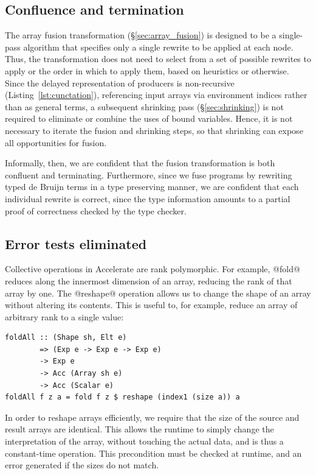 \subsection{Confluence and termination}

The array fusion transformation (\S\ref{sec:array_fusion}) is
designed to be a single-pass algorithm that specifies only a single rewrite to
be applied at each node. Thus, the transformation does not need to select from a
set of possible rewrites to apply or the order in which to apply them, based on
heuristics or otherwise. Since the delayed representation of producers is
non-recursive (Listing~\ref{lst:cunctation}), referencing input arrays via
environment indices rather than as general terms, a subsequent shrinking pass
(\S\ref{sec:shrinking}) is not required to eliminate or combine the uses of
bound variables. Hence, it is not necessary to iterate the fusion and shrinking
steps, so that shrinking can expose all opportunities for fusion.

Informally, then, we are confident that the fusion transformation is both
confluent and terminating. Furthermore, since we fuse programs by rewriting
typed de Bruijn terms in a type preserving manner, we are confident that each
individual rewrite is correct, since the type information amounts to a partial
proof of correctness checked by the type checker.


\subsection{Error tests eliminated}

Collective operations in Accelerate are rank polymorphic. For example, @fold@
reduces along the innermost dimension of an array, reducing the rank of that
array by one. The @reshape@ operation allows us to change the shape of an array
without altering its contents. This is useful to, for example, reduce an array
of arbitrary rank to a single value:
%
\begin{lstlisting}[style=haskell]
foldAll :: (Shape sh, Elt e)
        => (Exp e -> Exp e -> Exp e)
        -> Exp e
        -> Acc (Array sh e)
        -> Acc (Scalar e)
foldAll f z a = fold f z $ reshape (index1 (size a)) a
\end{lstlisting}
%
In order to reshape arrays efficiently, we require that the size of the source
and result arrays are identical. This allows the runtime to simply change the
interpretation of the array, without touching the actual data, and is thus a
constant-time operation. This precondition must be checked at runtime, and an
error generated if the sizes do not match.

